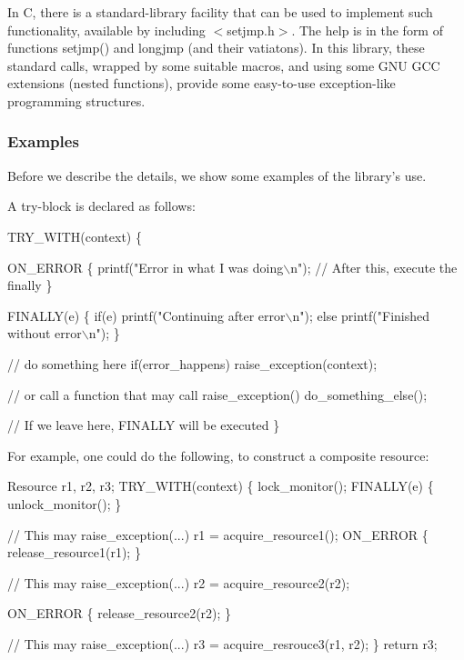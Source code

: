 In C, there is a standard-\/library facility that can be used to implement such functionality, available by including {\ttfamily $<$setjmp.\-h$>$}. The help is in the form of functions {\ttfamily setjmp()} and {\ttfamily longjmp} (and their vatiatons). In this library, these standard calls, wrapped by some suitable macros, and using some G\-N\-U G\-C\-C extensions (nested functions), provide some easy-\/to-\/use exception-\/like programming structures.

\subsubsection*{Examples}

Before we describe the details, we show some examples of the library's use.

A try-\/block is declared as follows\-: 
\begin{DoxyCode}
TRY\_WITH(context) \{

    ON\_ERROR \{
        printf(\textcolor{stringliteral}{"Error in what I was doing\(\backslash\)n"});
        \textcolor{comment}{// After this, execute the finally }
    \}

    FINALLY(e) \{
        \textcolor{keywordflow}{if}(e) 
            printf(\textcolor{stringliteral}{"Continuing after error\(\backslash\)n"});         
        \textcolor{keywordflow}{else}
            printf(\textcolor{stringliteral}{"Finished without error\(\backslash\)n"});
    \}

    \textcolor{comment}{// do something here }
    \textcolor{keywordflow}{if}(error\_happens)
        raise\_exception(context);

    \textcolor{comment}{// or call a function that may call raise\_exception()}
    do\_something\_else();

    \textcolor{comment}{// If we leave here, FINALLY will be executed }
\}
\end{DoxyCode}


For example, one could do the following, to construct a composite resource\-: 
\begin{DoxyCode}
Resource r1, r2, r3;
TRY\_WITH(context) \{
    lock\_monitor();
    FINALLY(e) \{
        unlock\_monitor();
    \}

    \textcolor{comment}{// This may raise\_exception(...)}
    r1 = acquire\_resource1();
    ON\_ERROR \{
        release\_resource1(r1);
    \}

    \textcolor{comment}{// This may raise\_exception(...)}
    r2 = acquire\_resource2(r2);

    ON\_ERROR \{
        release\_resource2(r2);
    \}
    
    \textcolor{comment}{// This may raise\_exception(...)}
    r3 = acquire\_resrouce3(r1, r2);
\}
\textcolor{keywordflow}{return} r3;
\end{DoxyCode}


